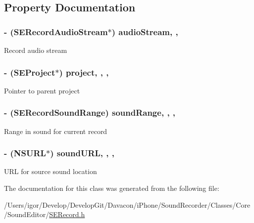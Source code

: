 \subsection{Property Documentation}
\hypertarget{interface_s_e_record_a91d05afe5637ae3b715c600c12a78bfb}{
\subsubsection[{audio\-Stream}]{\setlength{\rightskip}{0pt plus 5cm}-\/ ({\bf S\-E\-Record\-Audio\-Stream}$\ast$) audio\-Stream\hspace{0.3cm}{\ttfamily [read]}, {\ttfamily [nonatomic]}, {\ttfamily [assign]}}}\label{interface_s_e_record_a91d05afe5637ae3b715c600c12a78bfb}
Record audio stream \hypertarget{interface_s_e_record_a6051966cb1a3a4f0dcf0e3963fc9d129}{
\subsubsection[{project}]{\setlength{\rightskip}{0pt plus 5cm}-\/ ({\bf S\-E\-Project}$\ast$) project\hspace{0.3cm}{\ttfamily [read]}, {\ttfamily [write]}, {\ttfamily [nonatomic]}, {\ttfamily [weak]}}}\label{interface_s_e_record_a6051966cb1a3a4f0dcf0e3963fc9d129}
Pointer to parent project \hypertarget{interface_s_e_record_a4d80553d0b2ad098f0bb2555bd5fea35}{
\subsubsection[{sound\-Range}]{\setlength{\rightskip}{0pt plus 5cm}-\/ ({\bf S\-E\-Record\-Sound\-Range}) sound\-Range\hspace{0.3cm}{\ttfamily [read]}, {\ttfamily [write]}, {\ttfamily [nonatomic]}, {\ttfamily [assign]}}}\label{interface_s_e_record_a4d80553d0b2ad098f0bb2555bd5fea35}
Range in sound for current record \hypertarget{interface_s_e_record_a797e448b073754b26502fce4bc47585c}{
\subsubsection[{sound\-U\-R\-L}]{\setlength{\rightskip}{0pt plus 5cm}-\/ (N\-S\-U\-R\-L$\ast$) sound\-U\-R\-L\hspace{0.3cm}{\ttfamily [read]}, {\ttfamily [write]}, {\ttfamily [nonatomic]}, {\ttfamily [strong]}}}\label{interface_s_e_record_a797e448b073754b26502fce4bc47585c}
U\-R\-L for source sound location 

The documentation for this class was generated from the following file\-:\begin{DoxyCompactItemize}
\item 
/\-Users/igor/\-Develop/\-Develop\-Git/\-Davacon/i\-Phone/\-Sound\-Recorder/\-Classes/\-Core/\-Sound\-Editor/\hyperlink{_s_e_record_8h}{S\-E\-Record.\-h}\end{DoxyCompactItemize}
